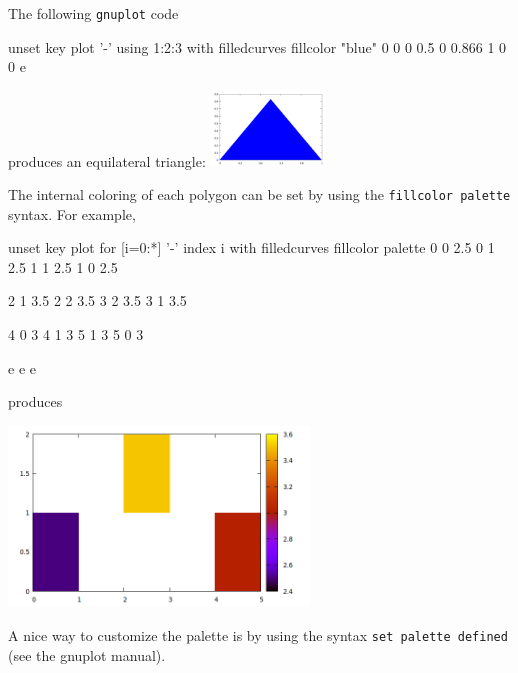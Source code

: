 \documentclass{article}
\begin{document}
The
following \texttt{gnuplot} code
\begin{code}
  unset key
  plot '-' using 1:2:3 with filledcurves fillcolor "blue"
  0 0 0
  0.5 0 0.866
  1 0 0
  e
\end{code}
produces an equilateral triangle: \includegraphics[height=2cm]{triangle.png}

\medskip

The internal coloring of each polygon can be set by using the
\texttt{fillcolor palette} syntax. For example,
\begin{scriptsize}
\begin{code}
unset key
plot for [i=0:*] '-' index i with filledcurves fillcolor palette
	0 0 2.5 
	0 1 2.5
	1 1 2.5
	1 0 2.5

	2 1 3.5 
	2 2 3.5
	3 2 3.5
	3 1 3.5

	4 0 3 
	4 1 3
	5 1 3
	5 0 3

e
e
e        
\end{code}
\end{scriptsize}
produces
\begin{center}
  \includegraphics[width=0.6\textwidth]{squares}
\end{center}

A nice way to customize the palette is by using the syntax \texttt{set
palette defined} (see the gnuplot manual).
\end{document}
